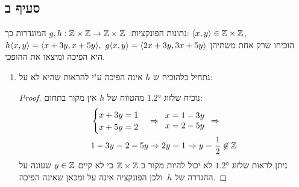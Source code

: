 \documentclass{article}
\begin{document}
\subsection*{סעיף ב}
נתונות הפונקציות: $g,h: \mathbb{Z} \times \mathbb{Z} \to \mathbb{Z} \times \mathbb{Z}$ המוגדרות כך: $\langle x,y \rangle \in \mathbb{Z} \times \mathbb{Z}$, \\
$h\ang{x,y} = \ang{x + 3y, x + 5y}, \ g\ang{x,y} = \ang{2x + 3y, 3x + 5y}$
הוכיחו שרק אחת משתיהן היא הפיכה ומיצאו את ההופכי.
\begin{enumerate}
	\item נתחיל בלהוכיח ש $h$ אינה הפיכה ע"י להראות שהיא לא על:
	\begin{proof}
		נוכיח שלזוג $\ang{1,2}$ מהטווח של $h$ אין מקור בתחום:
		\begin{align*}
			&\begin{cases}
				x + 3y = 1\\
				x + 5y = 2 \\
			\end{cases}
			\Rightarrow
			\begin{array}{l}
				x = 1 - 3y\\
				x = 2 - 5y \\
			\end{array}
			\Rightarrow \\
			&1 - 3y = 2 - 5y
			\Rightarrow
			2y = 1
			\Rightarrow
			y = \frac{1}{2} \not \in \mathbb{Z}
		\end{align*}
		ניתן לראות שלזוג $\ang{1,2}$ לא יכול להיות מקור ב $\mathbb{Z} \times \mathbb{Z}$ כי לא קיים $y \in \mathbb{Z}$ שעונה על ההגדרה של $h$.
		ולכן הפונקציה אינה על ומכאן שאינה הפיכה.
	\end{proof}


\end{enumerate}
\end{document}

